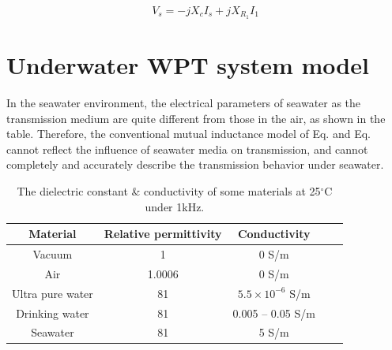 \begin{equation}
    V_s = -jX_cI_s + j X_{R_1}I_1
\end{equation}

\section{Underwater WPT system model}

In the seawater environment, the electrical parameters of seawater as the transmission medium are quite different from those in the air, as shown in the table. Therefore, the conventional mutual inductance model of Eq. and Eq. cannot reflect the influence of seawater media on transmission, and cannot completely and accurately describe the transmission behavior under seawater.

\begin{table}[htbp]
    \centering
    \caption{The dielectric constant \& conductivity of some materials at 25$^\circ$C under 1kHz.}
    \begin{tabular}{ |c|c|c|m{3.5cm}<{\centering}|m{3.5cm}<{\centering}| }
        \hline
        \textbf{Material} & \textbf{Relative permittivity} & \textbf{Conductivity}    \\\hline
        Vacuum            & 1                              & 0 S/m                    \\ \hline
        Air               & 1.0006                         & 0 S/m                    \\ \hline
        Ultra pure water  & 81                             & $5.5 \times 10^{-6}$ S/m \\ \hline
        Drinking water    & 81                             & 0.005 – 0.05 S/m         \\ \hline
        Seawater          & 81                             & 5 S/m                    \\ \hline
    \end{tabular}
    \label{table:permittivity}
\end{table}

